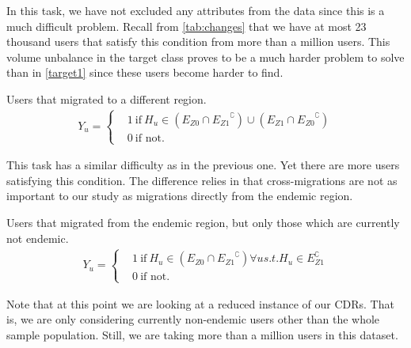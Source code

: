 In this task, we have not excluded any attributes from the data since this is a much difficult problem.
Recall from \cref{tab:changes} that we have at most 23 thousand users that satisfy this condition from more than a million users. This volume unbalance in the target class proves to be a much harder problem to solve than in \cref{target1} since these users become harder to find.



\begin{problem}\label{target3}
Users that migrated to a different region.
\begin{align*}
			Y_u =
			\begin{cases}
				&1 \ \mbox{if} \ H_u \in (E_{Z0} \cap { E_{Z1} }^{\complement}) \cup (E_{Z1} \cap { E_{Z0} }^{\complement}) \\
				&0 \ \mbox{if not}.
			\end{cases}
		\end{align*}
\end{problem}

This task has a similar difficulty as in the previous one. Yet there are more users satisfying this condition.
The difference relies in that cross-migrations are not as important to our study as migrations directly from the endemic region.

\begin{problem}\label{target4}
Users that migrated from the endemic region, but only those which are currently not endemic.
\begin{align*}
			Y_u =
			\begin{cases}
				&1 \ \mbox{if} \ H_u \in (E_{Z0} \cap { E_{Z1} }^{\complement}) \forall u s.t. H_u \in E_{Z1}^{\complement}    \\
				&0 \ \mbox{if not}.
			\end{cases}
		\end{align*}
\end{problem}

Note that at this point we are looking at a reduced instance of our CDRs. That is, we are only considering currently non-endemic users other than the whole sample population. Still, we are taking more than a million users in this dataset.



